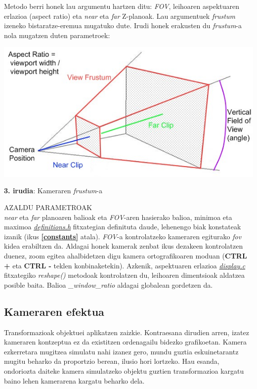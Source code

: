 \documentclass[12pt]{article}
\newcommand{\fitxategi}[1] {\underline{\textit{#1}}}
\newcommand{\metodo}[1] {\textit{#1}}
\newcommand{\aldagai}[1] {\textit{#1}}
\newcommand{\tekla}[1] {\textbf{#1}}
\newcommand{\erref}[1] {\textbf{\ref{#1}}}
\begin{document}
Metodo berri honek lau argumentu hartzen ditu: \textit{FOV}, leihoaren aspektuaren erlazioa (aspect ratio)\cite{aspect_ratio} eta \textit{near} eta \textit{far} Z-planoak\cite{near_far}. Lau argumentuek \textit{frustum}\cite{frustum} izeneko bistaratze-eremua mugatuko dute. Irudi honek erakusten du \textit{frustum}-a nola mugatzen duten parametroek:

\begin{center}
\includegraphics[scale=0.8]{kamera_frustum.jpg}

\textbf{3. irudia}: Kameraren \textit{frustum}-a
\end{center}

AZALDU PARAMETROAK\\

\textit{near} eta \textit{far} planoaren balioak eta \textit{FOV}-aren hasierako balioa, minimoa eta maximoa \fitxategi{definitions.h} fitxategian definituta daude, lehenengo biak konstateak izanik (ikus \erref{constants} atala). \textit{FOV}-a kontrolatzeko kameraren egiturako \aldagai{fov} kidea erabiltzen da. Aldagai honek kamerak zenbat ikus dezakeen kontrolatzen duenez, zoom egitea ahalbidetzen digu kamera ortografikoaren moduan (\tekla{CTRL +} eta \tekla{CTRL -} teklen konbinaketekin). Azkenik, aspektuaren erlazioa \fitxategi{display.c} fitxategiko \metodo{reshape()} metodoak kontrolatzen du, leihoaren dimentsioak aldatzea posible baita. Balioa \aldagai{\_window\_ratio} aldagai globalean gordetzen da.


\subsection{Kameraren efektua}\label{kam_sim}

Transformazioak objektuei aplikatzen zaizkie. Kontraesana dirudien arren, izatez kameraren kontzeptua ez da existitzen ordenagailu bidezko grafikoetan. Kamera ezkerretara mugitzea simulatu nahi izanez gero, mundu guztia eskuinetarantz mugitu beharko da proportzio berean, ilusio hori lortzeko. Hau esanda, ondoriozta daiteke kamera simulatzeko objektu guztien transformazioa kargatu baino lehen kamerarena kargatu beharko dela.
\end{document}
